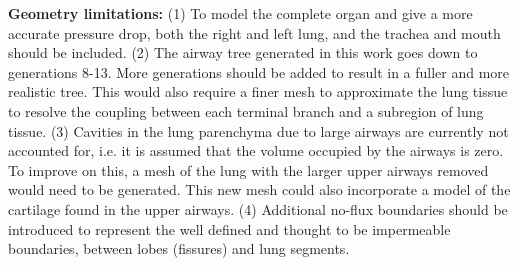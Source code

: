 \noindent \textbf{Geometry limitations:} (1) To model the complete organ and give a more accurate pressure drop, both the right and left lung, and the trachea and mouth should be included. (2) The airway tree generated in this work goes down to generations 8-13. More generations should be added to result in a fuller and more realistic tree. This would also require a finer mesh to approximate the lung tissue to resolve the coupling between each terminal branch and a subregion of lung tissue. (3) Cavities in the lung parenchyma due to large airways are currently not accounted for, i.e. it is assumed that the volume occupied by the airways is zero. To improve on this, a mesh of the lung with the larger upper airways removed would need to be generated. This new mesh could also incorporate a model of the cartilage found in the upper airways. (4) Additional no-flux boundaries should be introduced to represent the well defined and thought to be impermeable boundaries, between lobes (fissures) and lung segments.







